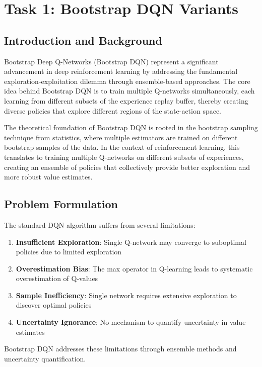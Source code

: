 \documentclass[12pt]{article}
\begin{document}
{{{\section{Task 1: Bootstrap DQN Variants}

\subsection{Introduction and Background}

Bootstrap Deep Q-Networks (Bootstrap DQN) represent a significant advancement in deep reinforcement learning by addressing the fundamental exploration-exploitation dilemma through ensemble-based approaches. The core idea behind Bootstrap DQN is to train multiple Q-networks simultaneously, each learning from different subsets of the experience replay buffer, thereby creating diverse policies that explore different regions of the state-action space.

The theoretical foundation of Bootstrap DQN is rooted in the bootstrap sampling technique from statistics, where multiple estimators are trained on different bootstrap samples of the data. In the context of reinforcement learning, this translates to training multiple Q-networks on different subsets of experiences, creating an ensemble of policies that collectively provide better exploration and more robust value estimates.

\subsection{Problem Formulation}

The standard DQN algorithm suffers from several limitations:
\begin{enumerate}
    \item \textbf{Insufficient Exploration}: Single Q-network may converge to suboptimal policies due to limited exploration
    \item \textbf{Overestimation Bias}: The max operator in Q-learning leads to systematic overestimation of Q-values
    \item \textbf{Sample Inefficiency}: Single network requires extensive exploration to discover optimal policies
    \item \textbf{Uncertainty Ignorance}: No mechanism to quantify uncertainty in value estimates
\end{enumerate}

Bootstrap DQN addresses these limitations through ensemble methods and uncertainty quantification.

}}}
\end{document}
